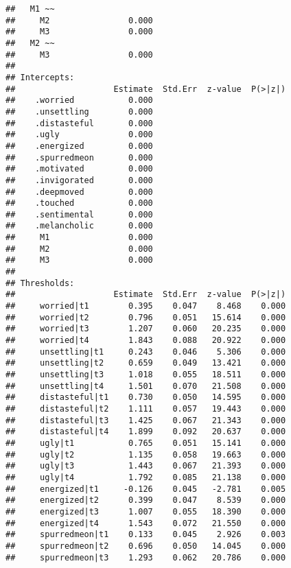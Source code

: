 \documentclass[
]{article}
\begin{document}
\begin{verbatim}
##   M1 ~~                                               
##     M2                0.000                           
##     M3                0.000                           
##   M2 ~~                                               
##     M3                0.000                           
## 
## Intercepts:
##                    Estimate  Std.Err  z-value  P(>|z|)
##    .worried           0.000                           
##    .unsettling        0.000                           
##    .distasteful       0.000                           
##    .ugly              0.000                           
##    .energized         0.000                           
##    .spurredmeon       0.000                           
##    .motivated         0.000                           
##    .invigorated       0.000                           
##    .deepmoved         0.000                           
##    .touched           0.000                           
##    .sentimental       0.000                           
##    .melancholic       0.000                           
##     M1                0.000                           
##     M2                0.000                           
##     M3                0.000                           
## 
## Thresholds:
##                    Estimate  Std.Err  z-value  P(>|z|)
##     worried|t1        0.395    0.047    8.468    0.000
##     worried|t2        0.796    0.051   15.614    0.000
##     worried|t3        1.207    0.060   20.235    0.000
##     worried|t4        1.843    0.088   20.922    0.000
##     unsettling|t1     0.243    0.046    5.306    0.000
##     unsettling|t2     0.659    0.049   13.421    0.000
##     unsettling|t3     1.018    0.055   18.511    0.000
##     unsettling|t4     1.501    0.070   21.508    0.000
##     distasteful|t1    0.730    0.050   14.595    0.000
##     distasteful|t2    1.111    0.057   19.443    0.000
##     distasteful|t3    1.425    0.067   21.343    0.000
##     distasteful|t4    1.899    0.092   20.637    0.000
##     ugly|t1           0.765    0.051   15.141    0.000
##     ugly|t2           1.135    0.058   19.663    0.000
##     ugly|t3           1.443    0.067   21.393    0.000
##     ugly|t4           1.792    0.085   21.138    0.000
##     energized|t1     -0.126    0.045   -2.781    0.005
##     energized|t2      0.399    0.047    8.539    0.000
##     energized|t3      1.007    0.055   18.390    0.000
##     energized|t4      1.543    0.072   21.550    0.000
##     spurredmeon|t1    0.133    0.045    2.926    0.003
##     spurredmeon|t2    0.696    0.050   14.045    0.000
##     spurredmeon|t3    1.293    0.062   20.786    0.000

\end{verbatim}
\end{document}
